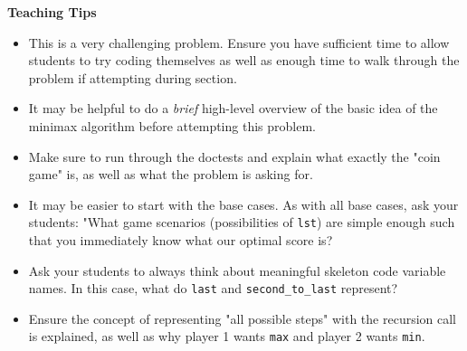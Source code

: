 \begin{blocksection}
 \begin{guide}
   \textbf{Teaching Tips}
   \begin{itemize}
   	   \item This is a very challenging problem. Ensure you have sufficient time to allow students to try coding themselves as well as enough time to walk through the problem if attempting during section.
   	   \item It may be helpful to do a \textit{brief} high-level overview of the basic idea of the minimax algorithm before attempting this problem. 
       \item Make sure to run through the doctests and explain what exactly the "coin game" is, as well as what the problem is asking for.
       \item It may be easier to start with the base cases. As with all base cases, ask your students: "What game scenarios (possibilities of \verb|lst|) are simple enough such that you immediately know what our optimal score is? 
       \item Ask your students to always think about meaningful skeleton code variable names. In this case, what do \verb|last| and \verb|second_to_last| represent? 
       \item Ensure the concept of representing "all possible steps" with the recursion call is explained, as well as why player 1 wants \verb|max| and player 2 wants \verb|min|. 
   \end{itemize}
 \end{guide}
 \end{blocksection}



